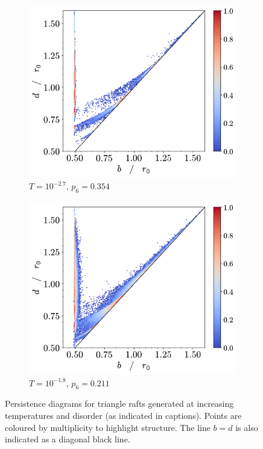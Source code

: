 \begin{figure}[tb]
     \vspace{0.5cm}
     \begin{subfigure}[b]{0.48\textwidth}
         \centering
         \includegraphics[width=\textwidth]{./figures/ph/t-2700_tr_pd.pdf}
         \caption{$T=10^{-2.7}$, $p_6=0.354$}
         \label{fig:trpdc}
     \end{subfigure}
     \hfill
      \begin{subfigure}[b]{0.48\textwidth}
         \centering
         \includegraphics[width=\textwidth]{./figures/ph/t-1800_tr_pd.pdf}
         \caption{$T=10^{-1.8}$, $p_6=0.211$}
         \label{fig:trpdd}
     \end{subfigure}
     \hfill
    
	\caption{Persistence diagrams for triangle rafts generated at increasing temperatures and disorder (as indicated in captions). Points are coloured by multiplicity to highlight structure. The line $b=d$ is also indicated as a diagonal black line.}
	\label{fig:trpd}
\end{figure}

